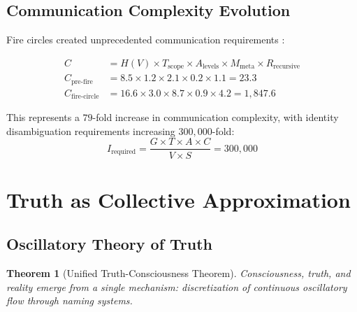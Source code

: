 \documentclass[12pt,a4paper]{article}
\newtheorem{theorem}{Theorem}[section]
\begin{document}
\subsection{Communication Complexity Evolution}

Fire circles created unprecedented communication requirements \citep{dunbar1996grooming}:

\begin{align}
C &= H(V) \times T_{\text{scope}} \times A_{\text{levels}} \times M_{\text{meta}} \times R_{\text{recursive}}\\
C_{\text{pre-fire}} &= 8.5 \times 1.2 \times 2.1 \times 0.2 \times 1.1 = 23.3\\
C_{\text{fire-circle}} &= 16.6 \times 3.0 \times 8.7 \times 0.9 \times 4.2 = 1,847.6
\end{align}

This represents a $79$-fold increase in communication complexity, with identity disambiguation requirements increasing $300,000$-fold:
$$I_{\text{required}} = \frac{G \times T \times A \times C}{V \times S} = 300,000$$

\section{Truth as Collective Approximation}

\subsection{Oscillatory Theory of Truth}

\begin{theorem}[Unified Truth-Consciousness Theorem]
Consciousness, truth, and reality emerge from a single mechanism: discretization of continuous oscillatory flow through naming systems.
\end{theorem}
\end{document}
